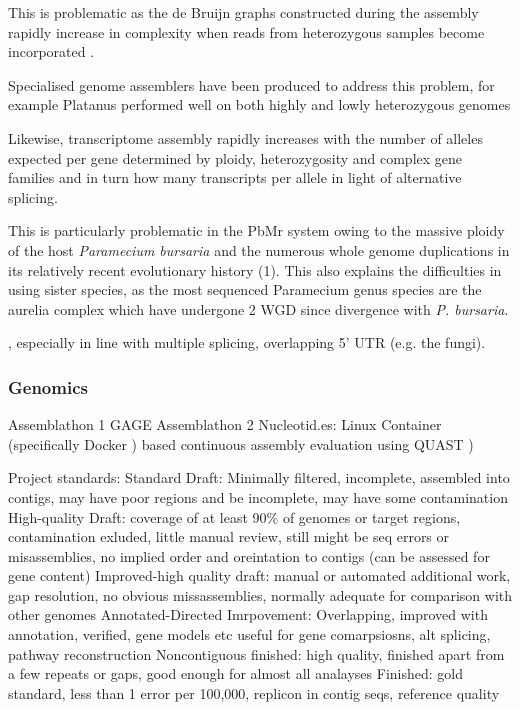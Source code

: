 This is problematic as the de Bruijn graphs constructed during the assembly
rapidly increase in complexity when reads from heterozygous samples become
incorporated \citep{Kajitani2014}.


Specialised genome assemblers have been produced to address this problem,
for example Platanus performed well on both highly and lowly heterozygous 
genomes \citep{Katjitani2014}

Likewise, transcriptome assembly rapidly increases with the number of alleles
expected per gene determined by ploidy, heterozygosity and complex gene families
and in turn how many transcripts per allele in light of alternative splicing.

This is particularly problematic in the PbMr system owing to the massive
ploidy of the host \textit{Paramecium bursaria} and the numerous whole genome
duplications in its relatively recent evolutionary history (1).  This also 
explains the difficulties in using sister species, as the most sequenced Paramecium
genus species are the aurelia complex which have undergone 2 WGD since divergence with
\textit{P. bursaria}.

, especially in line with multiple splicing, overlapping 5' UTR (e.g.
the fungi).




\subsubsection{Genomics}

Assemblathon 1 \citep{Earl2011}
GAGE \citep{Schatz2012}
Assemblathon 2 \citep{Bradnam2013}
Nucleotid.es: Linux Container (specifically Docker \citep{Merkel2014})  based continuous assembly evaluation using QUAST \citep{Gurevich2013a})


Project standards:
Standard Draft: Minimally filtered, incomplete, assembled into contigs, may have poor regions and be incomplete, may have some contamination
High-quality Draft: coverage of at least 90\% of genomes or target regions, contamination exluded, little manual review, still might be seq errors or misassemblies, no implied order and oreintation to contigs (can be assessed for gene content)
Improved-high quality draft: manual or automated additional work, gap resolution, no obvious missassemblies, normally adequate for comparison with other genomes
Annotated-Directed Imrpovement: Overlapping, improved with annotation, verified, gene models etc useful for gene comarpsiosns, alt splicing, pathway reconstruction
Noncontiguous finished: high quality, finished apart from a few repeats or gaps, good enough for almost all analayses
Finished: gold standard, less than 1 error per 100,000, replicon in contig seqs, reference quality \citep{Chain2009}




